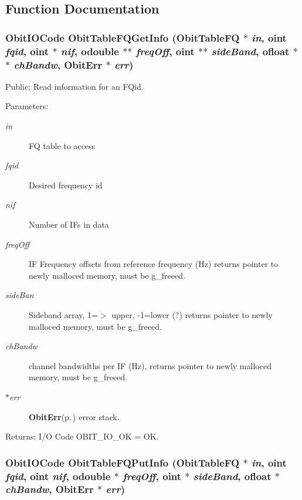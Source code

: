 \subsection{Function Documentation}
\subsubsection{\setlength{\rightskip}{0pt plus 5cm}Obit\-IOCode Obit\-Table\-FQGet\-Info ({\bf Obit\-Table\-FQ} $\ast$ {\em in}, {\bf oint} {\em fqid}, {\bf oint} $\ast$ {\em nif}, {\bf odouble} $\ast$$\ast$ {\em freq\-Off}, {\bf oint} $\ast$$\ast$ {\em side\-Band}, {\bf ofloat} $\ast$$\ast$ {\em ch\-Bandw}, {\bf Obit\-Err} $\ast$ {\em err})}\label{ObitTableFQUtil_8c_a0}


Public: Read information for an FQid. 

\begin{Desc}
\item[Parameters:]
\begin{description}
\item[{\em in}]FQ table to access \item[{\em fqid}]Desired frequency id \item[{\em nif}]Number of IFs in data \item[{\em freq\-Off}]IF Frequency offsets from reference frequency (Hz) returns pointer to newly malloced memory, must be g\_\-freeed. \item[{\em side\-Ban}]Sideband array, 1=$>$ upper, -1=lower (?) returns pointer to newly malloced memory, must be g\_\-freeed. \item[{\em ch\-Bandw}]channel bandwidths per IF (Hz), returns pointer to newly malloced memory, must be g\_\-freeed. \item[{\em $\ast$err}]{\bf Obit\-Err}{\rm (p.\,\pageref{structObitErr})} error stack. \end{description}
\end{Desc}
\begin{Desc}
\item[Returns:]I/O Code OBIT\_\-IO\_\-OK = OK. \end{Desc}
\subsubsection{\setlength{\rightskip}{0pt plus 5cm}Obit\-IOCode Obit\-Table\-FQPut\-Info ({\bf Obit\-Table\-FQ} $\ast$ {\em in}, {\bf oint} {\em fqid}, {\bf oint} {\em nif}, {\bf odouble} $\ast$ {\em freq\-Off}, {\bf oint} $\ast$ {\em side\-Band}, {\bf ofloat} $\ast$ {\em ch\-Bandw}, {\bf Obit\-Err} $\ast$ {\em err})}\label{ObitTableFQUtil_8c_a1}


